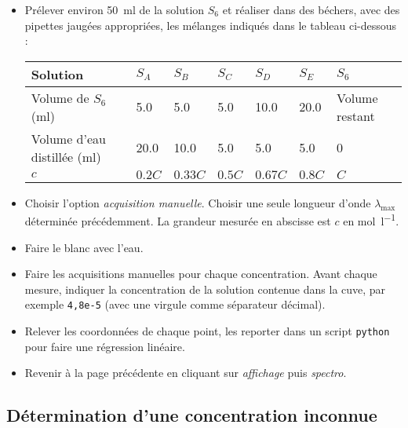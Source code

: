 \documentclass{tp}
\begin{document}
\begin{itemize}
  \item Prélever environ \SI{50}{\milli\litre} de la solution $S_6$ et réaliser dans des béchers, avec des pipettes jaugées appropriées, les mélanges indiqués dans le tableau ci-dessous : 
  \begin{center}
  \renewcommand{\arraystretch}{1.2}
    \begin{tabular}{lllllll}
      \toprule
      Solution & $S_A$ & $S_B$ & $S_C$ & $S_D$ & $S_E$ & $S_6$ \\
      \midrule
      Volume de $S_6$ (\si{\milli\litre}) & \num{5.0}& \num{5.0} & \num{5.0} & \num{10.0} & \num{20.0} & Volume restant \\
      Volume d'eau distillée (\si{\milli\litre}) & \num{20.0}& \num{10.0} & \num{5.0} & \num{5.0} & \num{5.0}& \num{0} \\
      $c$  & $\num{0.2}C$ & $\num{0.33}C$  & $\num{0.5}C$ & $\num{0.67}C$ & $\num{0.8}C$ & $C$ \\
      \bottomrule
    \end{tabular}
  \end{center}
  \item Choisir l'option \emph{acquisition manuelle}. Choisir une seule longueur d'onde $\lambda_\text{max}$ déterminée précédemment. La grandeur mesurée en abscisse est $c$ en \si{\mol\per\litre}.

    \item Faire le blanc avec l'eau.

  \item Faire les acquisitions manuelles pour chaque concentration. Avant chaque mesure, indiquer la concentration de la solution contenue dans la cuve, par exemple \texttt{4,8e-5} (avec une virgule comme séparateur décimal).

  \item Relever les coordonnées de chaque point, les reporter dans un script \texttt{python} pour faire une régression linéaire.

  \item Revenir à la page précédente en cliquant sur \emph{affichage} puis \emph{spectro}.
\end{itemize}

\subsection{Détermination d'une concentration inconnue}%
\label{sub:determination_d_une_concentration_inconnue}
\end{document}
